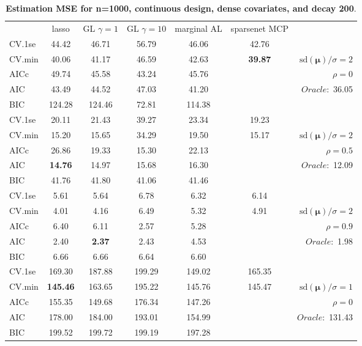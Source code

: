 \clearpage
\begin{table}\vspace{-.5cm}
\caption[l]{ { \bf Estimation MSE for n=1000, continuous design, 
dense covariates, and  decay  200}.}
\vspace{-.5cm}
\footnotesize{}
\begin{center}
\begin{tabular}{l*{5}{c}|r}
& lasso & GL $\gamma=1$ & GL $\gamma=10$ & marginal AL & sparsenet MCP  & \\
 \cline{1-7}
CV.1se & 44.42 & 46.71 & 56.79 & 46.06 & 42.76 & \\
CV.min & 40.06 & 41.17 & 46.59 & 42.63 & {\bf 39.87} &  $\mathrm{sd}(\mathbf{\mu})/\sigma=2$ \\
AICc & 49.74 & 45.58 & 43.24 & 45.76 & & $\rho=0$ \\
AIC & 43.49 & 44.52 & 47.03 & 41.20 & &  \multirow{2}{*}{$Oracle: $ 36.05} \\
BIC & 124.28 & 124.46 & 72.81 & 114.38 & &  \\
 \hline 
CV.1se & 20.11 & 21.43 & 39.27 & 23.34 & 19.23 & \\
CV.min & 15.20 & 15.65 & 34.29 & 19.50 & 15.17 &  $\mathrm{sd}(\mathbf{\mu})/\sigma=2$ \\
AICc & 26.86 & 19.33 & 15.30 & 22.13 & & $\rho=0.5$ \\
AIC & {\bf 14.76} & 14.97 & 15.68 & 16.30 & &  \multirow{2}{*}{$Oracle: $ 12.09} \\
BIC & 41.76 & 41.80 & 41.06 & 41.46 & &  \\
 \hline 
CV.1se & 5.61 & 5.64 & 6.78 & 6.32 & 6.14 & \\
CV.min & 4.01 & 4.16 & 6.49 & 5.32 & 4.91 &  $\mathrm{sd}(\mathbf{\mu})/\sigma=2$ \\
AICc & 6.40 & 6.11 & 2.57 & 5.28 & & $\rho=0.9$ \\
AIC & 2.40 & {\bf 2.37} & 2.43 & 4.53 & &  \multirow{2}{*}{$Oracle: $ 1.98} \\
BIC & 6.66 & 6.66 & 6.64 & 6.60 & &  \\
 \hline 
CV.1se & 169.30 & 187.88 & 199.29 & 149.02 & 165.35 & \\
CV.min & {\bf 145.46} & 163.65 & 195.22 & 145.76 & 145.47 &  $\mathrm{sd}(\mathbf{\mu})/\sigma=1$ \\
AICc & 155.35 & 149.68 & 176.34 & 147.26 & & $\rho=0$ \\
AIC & 178.00 & 184.00 & 193.01 & 154.99 & &  \multirow{2}{*}{$Oracle: $ 131.43} \\
BIC & 199.52 & 199.72 & 199.19 & 197.28 & &  \\

\end{tabular}
\end{center}
\end{table}
